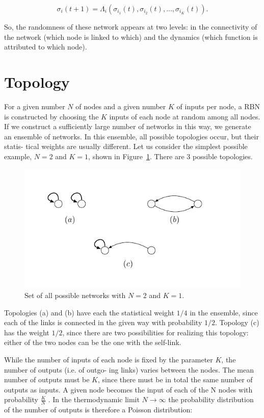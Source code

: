 \begin{equation}
\sigma_i(t+1)=\Lambda_i(\sigma_{i_1}(t),\sigma_{i_2}(t), ...,\sigma_{i_K}(t)).
\end{equation}  

So, the randomness of these network appears at two levels: in the connectivity of the network (which node is linked
to which) and the dynamics (which function is attributed to which node).

\section{Topology}
For a given number $N$ of nodes and a given number
$K$ of inputs per node, a RBN is constructed by choosing
the $K$ inputs of each node at random among all nodes.
If we construct a sufficiently large number of networks in
this way, we generate an ensemble of networks. In this
ensemble, all possible topologies occur, but their statis-
tical weights are usually different. Let us consider the
simplest possible example, $N = 2$ and $K = 1$, shown
in Figure~\ref{fig:rb}. There are 3 possible topologies.



\begin{figure}[h]
\centering
\includegraphics[scale=1]{figurenetworks.pdf}
\caption{Set of all possible networks with $N=2$ and $K=1$.}
\label{fig:rb}
\end{figure}

Topologies (a) and (b) have each the statistical weight $1/4$ in
the ensemble, since each of the links is connected in the
given way with probability $1/2$. Topology (c) has the
weight $1/2$, since there are two possibilities for realizing
this topology: either of the two nodes can be the one
with the self-link.


While the number of inputs of each node is fixed by
the parameter $K$, the number of outputs (i.e. of outgo-
ing links) varies between the nodes. The mean number of
outputs must be $K$, since there must be in total the same
number of outputs as inputs. A given node becomes the
input of each of the N nodes with probability $\frac{K}{N}$ . In
the thermodynamic limit $N \to \infty$ the probability distribution of the number of outputs is therefore a Poisson
distribution:

